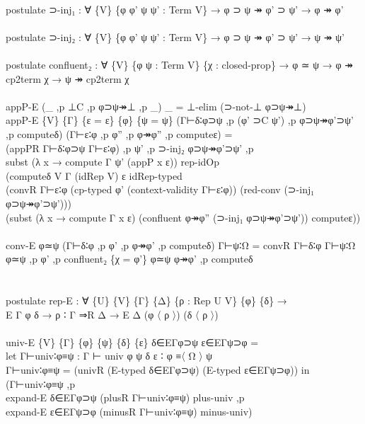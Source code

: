 {\begin{code}
{\>\<\\
\>postulate ⊃-inj₁ : ∀ \{V\} \{φ φ' ψ ψ' : Term V\} → φ ⊃ ψ ↠ φ' ⊃ ψ' → φ ↠ φ'\<\\
\>\<\\
\>postulate ⊃-inj₂ : ∀ \{V\} \{φ φ' ψ ψ' : Term V\} → φ ⊃ ψ ↠ φ' ⊃ ψ' → ψ ↠ ψ'\<\\
\>\<\\
\>postulate confluent₂ : ∀ \{V\} \{φ ψ : Term V\} \{χ : closed-prop\} → φ ≃ ψ → φ ↠ cp2term χ → ψ ↠ cp2term χ\<\\
\>\<\\
\>appP-E (\_ ,p ⊥C ,p φ⊃ψ↠⊥ ,p \_) \_ = ⊥-elim (⊃-not-⊥ φ⊃ψ↠⊥)\<\\
\>appP-E \{V\} \{Γ\} \{ε = ε\} \{φ\} \{ψ = ψ\} (Γ⊢δ∶φ⊃ψ ,p (φ' ⊃C ψ') ,p φ⊃ψ↠φ'⊃ψ' ,p computeδ) (Γ⊢ε∶φ ,p φ'' ,p φ↠φ'' ,p computeε) = \<\\
\>  (appPR Γ⊢δ∶φ⊃ψ Γ⊢ε∶φ) ,p ψ' ,p ⊃-inj₂ φ⊃ψ↠φ'⊃ψ' ,p \<\\
\>  subst (λ x → compute Γ ψ' (appP x ε)) rep-idOp \<\\
\>  (computeδ V Γ (idRep V) ε idRep-typed \<\\
\>    (convR Γ⊢ε∶φ (cp-typed φ' (context-validity Γ⊢ε∶φ)) (red-conv (⊃-inj₁ φ⊃ψ↠φ'⊃ψ')))\<\\
\>  (subst (λ x → compute Γ x ε) (confluent φ↠φ'' (⊃-inj₁ φ⊃ψ↠φ'⊃ψ')) computeε))\<\\
\>\<\\
\>conv-E φ≃ψ (Γ⊢δ∶φ ,p φ' ,p φ↠φ' ,p computeδ) Γ⊢ψ∶Ω = convR Γ⊢δ∶φ Γ⊢ψ∶Ω φ≃ψ ,p φ' ,p confluent₂ \{χ = φ'\} φ≃ψ φ↠φ' ,p computeδ\<\\
\>\<\\
\>\<\\
\>postulate rep-E : ∀ \{U\} \{V\} \{Γ\} \{Δ\} \{ρ : Rep U V\} \{φ\} \{δ\} →\<\\
\>                 E Γ φ δ → ρ ∶ Γ ⇒R Δ → E Δ (φ 〈 ρ 〉) (δ 〈 ρ 〉)\<\\
\>\<\\
\>univ-E \{V\} \{Γ\} \{φ\} \{ψ\} \{δ\} \{ε\} δ∈EΓφ⊃ψ ε∈EΓψ⊃φ = \<\\
\>  let Γ⊢univ∶φ≡ψ : Γ ⊢ univ φ ψ δ ε ∶ φ ≡〈 Ω 〉 ψ\<\\
\>      Γ⊢univ∶φ≡ψ = (univR (E-typed δ∈EΓφ⊃ψ) (E-typed ε∈EΓψ⊃φ)) in\<\\
\>      (Γ⊢univ∶φ≡ψ ,p \<\\
\>      expand-E δ∈EΓφ⊃ψ (plusR Γ⊢univ∶φ≡ψ) plus-univ ,p \<\\
\>      expand-E ε∈EΓψ⊃φ (minusR Γ⊢univ∶φ≡ψ) minus-univ)\<\\
\>\<\\
}
\end{code}}

